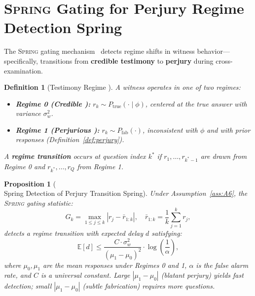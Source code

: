 \documentclass[11pt,a4paper]{article}
\newtheorem{proposition}[theorem]{Proposition}
\newtheorem{definition}[theorem]{Definition}
\theoremstyle{definition}
\newcommand{\Spring}{\textsc{Spring}}
\newcommand{\E}{\mathbb{E}}
\newcommand{\abs}[1]{\left|#1\right|}
\newcommand{\fact}{\phi}                        %
\begin{document}
\section{\Spring{} Gating for Perjury Regime Detection Spring}
\label{sec:spring}

The \Spring{} gating mechanism~\cite{SCX2025} detects regime shifts in witness behavior---specifically, transitions from \textbf{credible testimony} to \textbf{perjury} during cross-examination.

\begin{definition}[Testimony Regime ]
\label{def:regime}
A witness operates in one of two regimes:
\begin{itemize}
    \item \textbf{Regime 0 (Credible ):} $r_k \sim P_{\mathrm{true}}(\cdot \mid \fact)$, centered at the true answer with variance $\sigma_w^2$.
    \item \textbf{Regime 1 (Perjurious ):} $r_k \sim P_{\mathrm{fab}}(\cdot)$, inconsistent with $\fact$ and with prior responses (Definition~\ref{def:perjury}).
\end{itemize}
A \textbf{regime transition} occurs at question index $k^*$ if $r_1, \ldots, r_{k^*-1}$ are drawn from Regime 0 and $r_{k^*}, \ldots, r_Q$ from Regime 1.
\end{definition}

\begin{proposition}[\\Spring{} Detection of Perjury Transition Spring]
\label{prop:spring_perjury}
Under Assumption~\ref{ass:A6}, the \Spring{} gating statistic:
\begin{equation}
    G_k = \max_{1 \leq j \leq k} \abs{r_j - \bar{r}_{1:k}}, \quad \bar{r}_{1:k} = \frac{1}{k} \sum_{j=1}^k r_j,
    \label{eq:spring_stat}
\end{equation}
detects a regime transition with expected delay $d$ satisfying:
\begin{equation}
    \E[d] \leq \frac{C \cdot \sigma_w^2}{(\mu_1 - \mu_0)^2} \cdot \log\left(\frac{1}{\alpha}\right),
    \label{eq:spring_delay}
\end{equation}
where $\mu_0, \mu_1$ are the mean responses under Regimes 0 and 1, $\alpha$ is the false alarm rate, and $C$ is a universal constant. Large $\abs{\mu_1 - \mu_0}$ (blatant perjury) yields fast detection; small $\abs{\mu_1 - \mu_0}$ (subtle fabrication) requires more questions.
\end{proposition}
\end{document}
